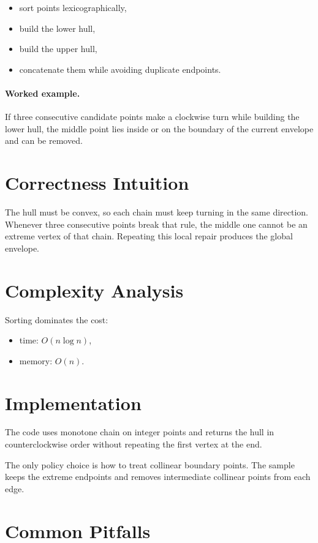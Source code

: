 \begin{itemize}
  \item sort points lexicographically,
  \item build the lower hull,
  \item build the upper hull,
  \item concatenate them while avoiding duplicate endpoints.
\end{itemize}

\paragraph{Worked example.}
If three consecutive candidate points make a clockwise turn while building the lower hull, the middle point lies inside
or on the boundary of the current envelope and can be removed.

\section*{Correctness Intuition}

The hull must be convex, so each chain must keep turning in the same direction. Whenever three consecutive points break
that rule, the middle one cannot be an extreme vertex of that chain. Repeating this local repair produces the global
envelope.

\section*{Complexity Analysis}

Sorting dominates the cost:
\begin{itemize}
  \item time: \(O(n \log n)\),
  \item memory: \(O(n)\).
\end{itemize}

\section*{Implementation}

The code uses monotone chain on integer points and returns the hull in counterclockwise order without repeating the
first vertex at the end.

The only policy choice is how to treat collinear boundary points. The sample keeps the extreme endpoints and removes
intermediate collinear points from each edge.

\section*{Common Pitfalls}

